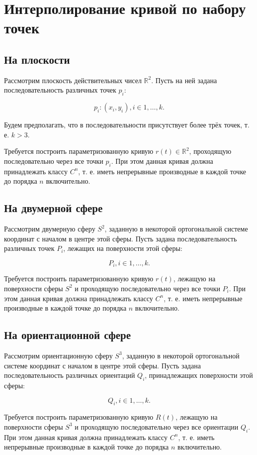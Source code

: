 \section{Интерполирование кривой по набору точек}

\subsection*{На плоскости}

Рассмотрим плоскость действительных чисел $\mathbb{R}^2$. Пусть на ней задана последовательность различных точек $p_i$:

$${p_i: (x_i, y_i)}, i \in {1, \dots, k}.$$

Будем предполагать, что в последовательности присутствует более трёх точек, т. е. $k > 3$.

Требуется построить параметризованную кривую $r(t) \in \mathbb{R}^2$, проходящую последовательно через все точки
$p_i$. При этом данная кривая должна принадлежать классу $C^n$, т. е. иметь непрерывные производные в каждой точке до
порядка $n$ включительно.

\subsection*{На двумерной сфере}

Рассмотрим двумерную сферу $S^2$, заданную в некоторой ортогональной системе координат с началом в центре этой сферы.
Пусть задана последовательность различных точек $P_i$, лежащих на поверхности этой сферы:

$${P_i}, i \in {1, \dots, k}.$$

Требуется построить параметризованную кривую $r(t)$, лежащую на поверхности сферы $S^2$ и проходящую последовательно
через все точки $P_i$. При этом данная кривая должна принадлежать классу $C^n$, т. е. иметь непрерывные производные в
каждой точке до порядка $n$ включительно.

\subsection*{На ориентационной сфере}

Рассмотрим ориентационную сферу $S^3$, заданную в некоторой ортогональной системе координат с началом в центре этой
сферы. Пусть задана последовательность различных ориентаций $Q_i$, принадлежащих поверхности этой сферы:

$${Q_i}, i \in {1, \dots, k}.$$

Требуется построить параметризованную кривую $R(t)$, лежащую на поверхности сферы $S^3$ и проходящую
последовательно через все ориентации $Q_i$. При этом данная кривая должна принадлежать классу $C^n$, т. е. иметь
непрерывные производные в каждой точке до порядка $n$ включительно.
